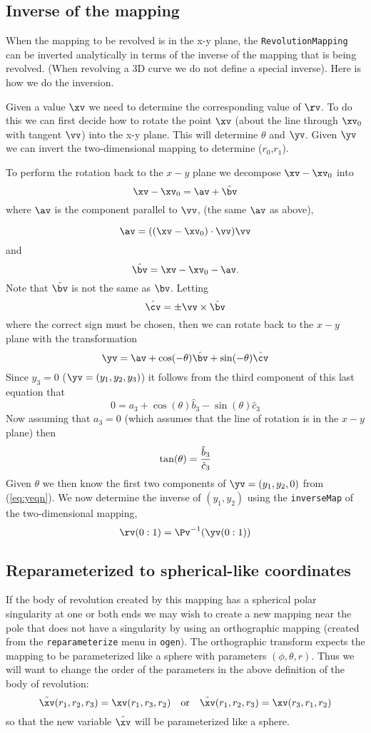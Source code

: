 \subsection{Inverse of the mapping}

  When the mapping to be revolved is in the x-y plane, 
the {\tt RevolutionMapping} can be inverted analytically in terms of the inverse
of the mapping that is being revolved. (When revolving a 3D curve we do not define
a special inverse). Here is how we do the inversion.

Given a value $\xv$ we need to determine the corresponding value of $\rv$.
To do this we can first decide how to rotate the point $\xv$ (about the
line through $\xv_0$ with tangent $\vv$) into the x-y plane. This will determine 
$\theta$ and $\yv$. Given $\yv$ we can invert the two-dimensional mapping to
determine ($r_0$,$r_1$).

To perform the rotation back to the $x-y$ plane we decompose $\xv-\xv_0$ into
\[
    \xv-\xv_0 = \av + \hat{\bv}
\]
where $\av$ is the component parallel to $\vv$, (the same $\av$ as above),

\[
   \av = ((\xv-\xv_0)\cdot\vv) \vv
\]
and
\[
    \hat{\bv} = \xv-\xv_0-\av.
\]
Note that $\hat{\bv}$ is not the same as $\bv$. Letting 
\[
   \hat{\cv} = \pm \vv\times {\hat\bv}
\]
where the correct sign must be chosen, then
we can rotate back to the $x-y$ plane with the transformation
\begin{equation}
  \yv = \av + \cos(-\theta) \hat{\bv} + \sin(-\theta) \hat{\cv}   \label{eq:yeqn}
\end{equation}
Since $y_3=0$ ($\yv=(y_1,y_2,y_3)$) it follows from the third
component of this last equation that 
\[
    0 = a_3 + \cos(\theta) \hat{b}_3 - \sin(\theta) \hat{c}_3 
\]
Now assuming that $a_3=0$ (which assumes that the line of rotation is in
the $x-y$ plane) then
\[
     \tan(\theta) = {\hat{b}_3 \over \hat{c}_3 }
\]
Given $\theta$ we then know the first two components of $\yv=(y_1,y_2,0)$ from (\ref{eq:yeqn}).
We now determine the inverse of $(y_1,y_2)$ using the {\tt inverseMap} of the two-dimensional
mapping,
\[
    \rv(0:1) = \Pv^{-1}(\yv(0:1))
\]

\subsection{Reparameterized to spherical-like coordinates}

If the body of revolution created by this mapping has a spherical
polar singularity at one or both ends we may wish to create a new
mapping near the pole that does not have a singularity by using an
orthographic mapping (created from the {\tt reparameterize} menu in
{\tt ogen}). The orthographic transform expects the mapping to be
parameterized like a sphere with parameters $(\phi,\theta,r)$.
Thus we will want to change the order of the parameters in the above
definition of the body of revolution:
\[
   \tilde{\xv}( r_1,r_2,r_3) = \xv(r_1,r_3,r_2) \mbox{~~~or~~~} 
   \tilde{\xv}( r_1,r_2,r_3) = \xv(r_3,r_1,r_2) 
\]
so that the new variable $\tilde{\xv}$ will be parameterized like a sphere.


